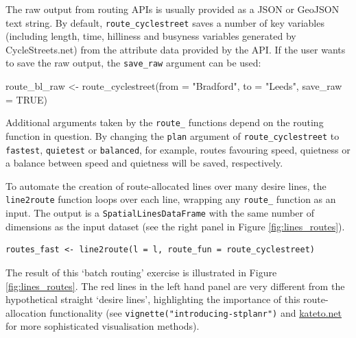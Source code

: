The raw output from routing APIs is usually provided as a JSON or
GeoJSON text string. By default, \texttt{route\_cyclestreet} saves a
number of key variables (including length, time, hilliness and busyness
variables generated by CycleStreets.net) from the attribute data
provided by the API. If the user wants to save the raw output, the
\texttt{save\_raw} argument can be used:

\begin{Schunk}
\begin{Sinput}
route_bl_raw <- route_cyclestreet(from = "Bradford", to = "Leeds", save_raw = TRUE)
\end{Sinput}
\end{Schunk}

Additional arguments taken by the \texttt{route\_} functions depend on
the routing function in question. By changing the \texttt{plan} argument
of \texttt{route\_cyclestreet} to \texttt{fastest}, \texttt{quietest} or
\texttt{balanced}, for example, routes favouring speed, quietness or a
balance between speed and quietness will be saved, respectively.

To automate the creation of route-allocated lines over many desire
lines, the \texttt{line2route} function loops over each line, wrapping
any \texttt{route\_} function as an input. The output is a
\texttt{SpatialLinesDataFrame} with the same number of dimensions as the
input dataset (see the right panel in Figure \ref{fig:lines_routes}).

\begin{verbatim}
routes_fast <- line2route(l = l, route_fun = route_cyclestreet)
\end{verbatim}

The result of this `batch routing' exercise is illustrated in Figure
\ref{fig:lines_routes}. The red lines in the left hand panel are very
different from the hypothetical straight `desire lines', highlighting the importance of this route-allocation
functionality (see \texttt{vignette("introducing-stplanr")} and \href{http://kateto.net/network-visualization}{kateto.net} for more sophisticated visualisation methods).

